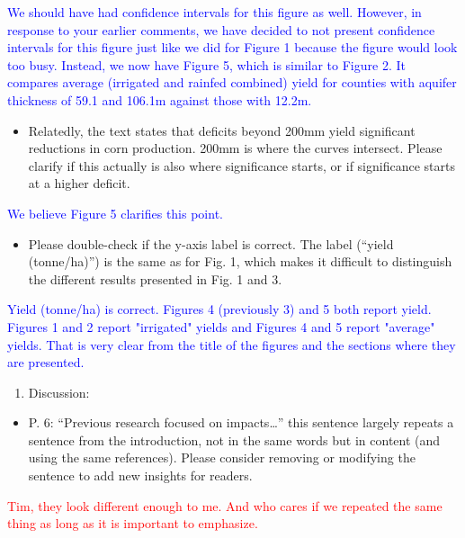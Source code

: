 \documentclass[
]{article}
\providecommand{\tightlist}{%
  \setlength{\itemsep}{0pt}\setlength{\parskip}{0pt}}
\begin{document}
\textcolor{blue}{
We should have had confidence intervals for this figure as well. However, in response to your earlier comments, we have decided to not present confidence intervals for this figure just like we did for Figure 1 because the figure would look too busy. Instead, we now have Figure 5, which is similar to Figure 2. It compares average (irrigated and rainfed combined) yield for counties with aquifer thickness of 59.1 and 106.1m against those with 12.2m. 
}

\begin{itemize}
\tightlist
\item
  Relatedly, the text states that deficits beyond 200mm yield
  significant reductions in corn production. 200mm is where the curves
  intersect. Please clarify if this actually is also where significance
  starts, or if significance starts at a higher deficit.
\end{itemize}

\textcolor{blue}{We believe Figure 5 clarifies this point.}

\begin{itemize}
\tightlist
\item
  Please double-check if the y-axis label is correct. The label (``yield
  (tonne/ha)'') is the same as for Fig. 1, which makes it difficult to
  distinguish the different results presented in Fig. 1 and 3.
\end{itemize}

\textcolor{blue}{Yield (tonne/ha) is correct. Figures 4 (previously 3) and 5 both report yield. Figures 1 and 2 report "irrigated" yields and Figures 4 and 5 report "average" yields. That is very clear from the title of the figures and the sections where they are presented.}

\begin{enumerate}
\def\labelenumi{\arabic{enumi}.}
\setcounter{enumi}{4}
\tightlist
\item
  Discussion:
\end{enumerate}

\begin{itemize}
\tightlist
\item
  P. 6: ``Previous research focused on impacts\ldots{}'' this sentence
  largely repeats a sentence from the introduction, not in the same
  words but in content (and using the same references). Please consider
  removing or modifying the sentence to add new insights for readers.
\end{itemize}

\textcolor{red}{Tim, they look different enough to me. And who cares if we repeated the same thing as long as it is important to emphasize.}
\end{document}
